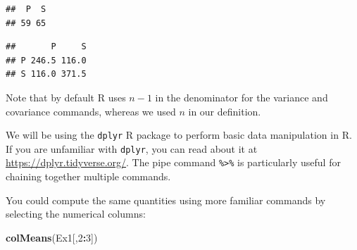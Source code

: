\documentclass[]{book}
\newenvironment{Shaded}{\begin{snugshade}}{\end{snugshade}}
\newcommand{\DataTypeTok}[1]{\textcolor[rgb]{0.13,0.29,0.53}{#1}}
\newcommand{\DecValTok}[1]{\textcolor[rgb]{0.00,0.00,0.81}{#1}}
\newcommand{\KeywordTok}[1]{\textcolor[rgb]{0.13,0.29,0.53}{\textbf{#1}}}
\newcommand{\NormalTok}[1]{#1}
\newcommand{\OperatorTok}[1]{\textcolor[rgb]{0.81,0.36,0.00}{\textbf{#1}}}
\newcommand{\StringTok}[1]{\textcolor[rgb]{0.31,0.60,0.02}{#1}}
\theoremstyle{definition}
\theoremstyle{definition}
\theoremstyle{definition}
\theoremstyle{remark}
\begin{document}
\begin{Shaded}
\end{Shaded}

\begin{verbatim}
##  P  S 
## 59 65
\end{verbatim}

\begin{Shaded}
\end{Shaded}

\begin{verbatim}
##       P     S
## P 246.5 116.0
## S 116.0 371.5
\end{verbatim}

Note that by default R uses \(n-1\) in the denominator for the variance and covariance commands, whereas we used \(n\) in our definition.

We will be using the \texttt{dplyr} R package to perform basic data manipulation in R. If you are unfamiliar with \texttt{dplyr}, you can read about it at \url{https://dplyr.tidyverse.org/}. The pipe command \texttt{\%\textgreater{}\%} is particularly useful for chaining together multiple commands.

You could compute the same quantities using more familiar commands by selecting the numerical columns:

\begin{Shaded}
\begin{Highlighting}[]
\KeywordTok{colMeans}\NormalTok{(Ex1[,}\DecValTok{2}\OperatorTok{:}\DecValTok{3}\NormalTok{])}
\end{Highlighting}
\end{Shaded}
\end{document}
